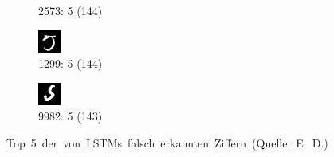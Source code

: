 \documentclass[a4paper,12pt,ngerman,oneside]{scrreprt}	%
\begin{document}
\begin{figure}[h]
\begin{subfigure}[t]{.19\linewidth}
				\caption{2573: 5 (144)}
			\end{subfigure}
			\begin{subfigure}[t]{.19\linewidth}
				\centering
				\includegraphics[height=0.6\linewidth]{top5LSTM/5-1299.png}
				\caption{1299: 5 (144)}
			\end{subfigure}
			\begin{subfigure}[t]{.19\linewidth}
				\centering
				\includegraphics[height=0.6\linewidth]{top5LSTM/5-9982.png}
				\caption{9982: 5 (143)}
			\end{subfigure}
			\vspace*{-2mm}
			\caption{\mbox{Top 5 der von LSTMs falsch erkannten Ziffern (Quelle: E. D.)}}\label{top5LSTM}
		\end{figure}
\end{document}
